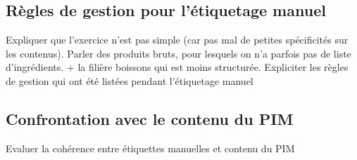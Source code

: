             \subsection{Règles de gestion pour l'étiquetage manuel}
        
            Expliquer que l'exercice n'est pas simple (car pas mal de petites spécificités sur les contenus). 
            Parler des produits bruts, pour lesquels on n'a parfois pas de liste d'ingrédients.
            + la filière boissons qui est moins structurée.
            Expliciter les règles de gestion qui ont été listées pendant l'étiquetage manuel

            \subsection{Confrontation avec le contenu du PIM}
            Evaluer la cohérence entre étiquettes manuelles et contenu du PIM
